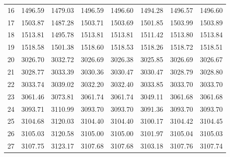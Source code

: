 \documentclass[10pt,oneside]{article}
\begin{document}
\begin{table}[h!]
\begin{tabular}{cccccccc}
16 &   1496.59 & 1479.03 & 1496.59 & 1496.60 &      1494.28 & 1496.57 & 1496.60 \\
17 &   1503.87 & 1487.28 & 1503.71 & 1503.69 &      1501.85 & 1503.99 & 1503.89 \\
18 &   1513.81 & 1495.78 & 1513.81 & 1513.81 &      1511.42 & 1513.80 & 1513.84 \\
19 &   1518.58 & 1501.38 & 1518.60 & 1518.53 &      1518.26 & 1518.72 & 1518.51 \\
20 &   3026.70 & 3032.72 & 3026.69 & 3026.38 &      3025.85 & 3026.69 & 3026.67 \\
21 &   3028.77 & 3033.39 & 3030.36 & 3030.47 &      3030.47 & 3028.79 & 3028.80 \\
22 &   3033.74 & 3039.02 & 3032.20 & 3032.40 &      3033.85 & 3033.70 & 3033.70 \\
23 &   3061.46 & 3073.81 & 3061.74 & 3061.74 &      3049.11 & 3061.68 & 3061.68 \\
24 &   3093.71 & 3110.99 & 3093.70 & 3093.70 &      3091.36 & 3093.70 & 3093.70 \\
25 &   3104.68 & 3120.03 & 3104.40 & 3104.40 &      3100.17 & 3104.42 & 3104.45 \\
26 &   3105.03 & 3120.58 & 3105.00 & 3105.00 &      3101.97 & 3105.04 & 3105.03 \\
27 &   3107.75 & 3123.17 & 3107.68 & 3107.68 &      3103.18 & 3107.76 & 3107.74 \\
\bottomrule
\end{tabular}
\end{table}

\clearpage
\end{document}
